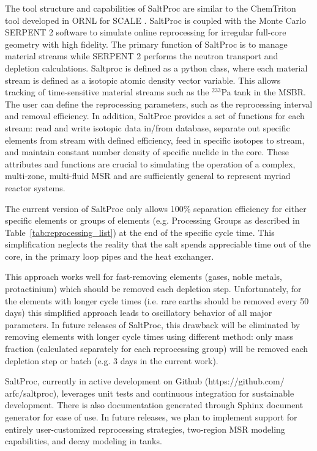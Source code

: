 The tool structure and capabilities of SaltProc are similar to the ChemTriton tool 
developed in \gls{ORNL} for SCALE \cite{powers_new_2013}. SaltProc is coupled 
with the Monte Carlo SERPENT 2
software to simulate online reprocessing for irregular full-core 
geometry with high fidelity.  The primary function of SaltProc is to 
manage material streams while SERPENT 2 performs the neutron 
transport and depletion calculations. Saltproc is defined as a python class, where 
each material stream is defined as a isotopic atomic density
vector variable. This allows tracking of time-sensitive material streams such 
as the 	$^{233}$Pa tank in the \gls{MSBR}. The user can define the reprocessing 
parameters, such as the reprocessing interval and removal efficiency.  In 
addition, SaltProc provides a set of functions for each stream: read and write 
isotopic data in/from database, separate out specific elements from stream with 
defined efficiency, feed in specific isotopes to stream, and maintain constant 
number density of specific nuclide in the core. These attributes and functions 
are crucial to simulating the operation of a complex, multi-zone, multi-fluid 
\gls{MSR} and are sufficiently general to represent myriad reactor systems.

The current version of SaltProc only allows 100\% separation efficiency for 
either specific elements or groups of elements (e.g. Processing Groups as described in 
Table~\ref{tab:reprocessing_list}) at the end of the specific cycle time. 
This simplification neglects the reality that the salt spends appreciable time 
out of the core, in the primary loop pipes and the heat exchanger.  

This approach works well for fast-removing elements (gases, noble metals, 
protactinium) which should be removed each depletion step. Unfortunately, 
for the elements with longer cycle times (i.e. rare earths should be removed 
every 50 days) this simplified approach leads to oscillatory behavior of all
major parameters. In future releases of SaltProc, this drawback will be eliminated 
by removing elements with longer cycle times using different method: only mass 
fraction (calculated separately for each reprocessing group) will be removed each
 depletion step or batch (e.g. 3 days in the current work).

SaltProc, currently in active development on Github (https://github.com/ 
arfc/saltproc), leverages unit tests and continuous integration for 
sustainable development. There is also documentation
generated through Sphinx document generator for ease of use. In future 
releases, we plan to 
implement
support for entirely user-customized reprocessing strategies, two-region \gls{MSR} modeling 
capabilities, and decay modeling in tanks.

